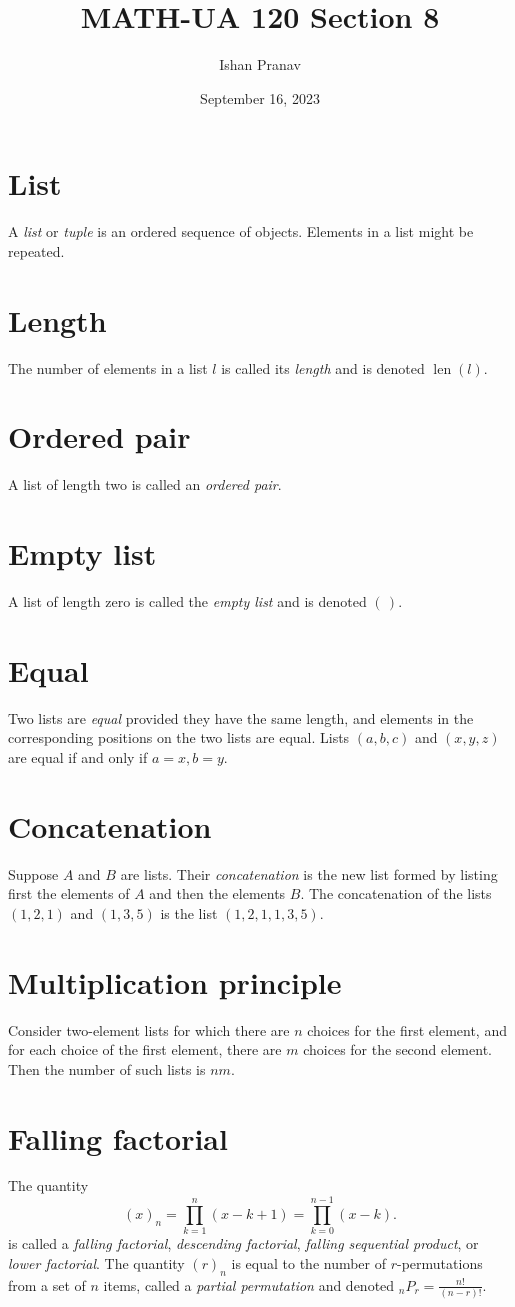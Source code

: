 \documentclass[12pt]{article}
\title{MATH-UA 120 Section 8}
\author{Ishan Pranav}
\date{September 16, 2023}
\DeclareMathOperator{\len}{len}
\begin{document}
\maketitle
\section*{List}
A \textit{list} or \textit{tuple} is an ordered sequence of objects. Elements in a list might be repeated.
\section*{Length}
The number of elements in a list $l$ is called its \textit{length} and is denoted $\len(l)$.
\section*{Ordered pair}
A list of length two is called an \textit{ordered pair}.
\section*{Empty list}
A list of length zero is called the \textit{empty list} and is denoted $(\,)$.
\section*{Equal}
Two lists are \textit{equal} provided they have the same length, and elements in the corresponding positions on the two lists are equal. Lists $(a,b,c)$ and $(x,y,z)$ are equal if and only if $a=x,b=y$.
\section*{Concatenation}
Suppose $A$ and $B$ are lists. Their \textit{concatenation} is the new list formed by listing first the elements of $A$ and then the elements $B$. The concatenation of the lists $(1,2,1)$ and $(1,3,5)$ is the list $(1,2,1,1,3,5)$.
\section*{Multiplication principle}
Consider two-element lists for which there are $n$ choices for the first element, and for each choice of the first element, there are $m$ choices for the second element. Then the number of such lists is $nm$. 
\section*{Falling factorial}
The quantity
\[(x)_n=\prod_{k=1}^n{(x-k+1)}=\prod_{k=0}^{n-1}{(x-k)}.\]
is called a \textit{falling factorial}, \textit{descending factorial}, \textit{falling sequential product}, or \textit{lower factorial}. The quantity $(r)_n$ is equal to the number of $r$-permutations from a set of $n$ items, called a \textit{partial permutation} and denoted ${}_nP_r=\frac{n!}{(n-r)!}$.
\end{document}
